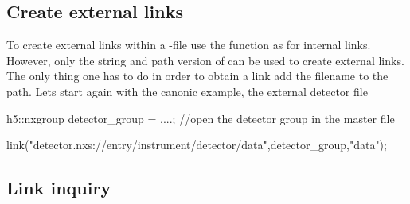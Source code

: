 \subsection{Create external links}

To create external links within a \nexus-file use the  function as for
internal links. However, only the string and path version of  can be
used to create external links. 
The only thing one has to do in order to obtain a link add the filename to the
path. Lets start again with the canonic example, the external detector file
\begin{cppcode}
h5::nxgroup detector_group = ....; //open the detector group in the master file

link("detector.nxs://entry/instrument/detector/data",detector_group,"data");


\end{cppcode}

\subsection{Link inquiry}
